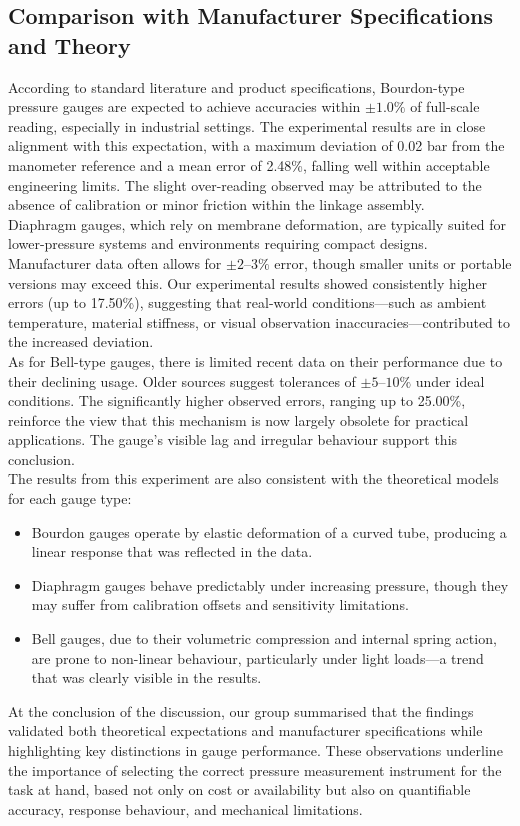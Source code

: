 \documentclass{article}
\begin{document}
\subsection{Comparison with Manufacturer Specifications and Theory}
According to standard literature and product specifications, Bourdon-type pressure gauges are expected to achieve accuracies within $\pm1.0\%$ of full-scale reading, especially in industrial settings. The experimental results are in close alignment with this expectation, with a maximum deviation of 0.02 bar from the manometer reference and a mean error of 2.48\%, falling well within acceptable engineering limits. The slight over-reading observed may be attributed to the absence of calibration or minor friction within the linkage assembly.\\[8pt]
Diaphragm gauges, which rely on membrane deformation, are typically suited for lower-pressure systems and environments requiring compact designs. Manufacturer data often allows for $\pm2$--$3\%$ error, though smaller units or portable versions may exceed this. Our experimental results showed consistently higher errors (up to 17.50\%), suggesting that real-world conditions—such as ambient temperature, material stiffness, or visual observation inaccuracies—contributed to the increased deviation.\\[8pt]
As for Bell-type gauges, there is limited recent data on their performance due to their declining usage. Older sources suggest tolerances of $\pm5$--$10\%$ under ideal conditions. The significantly higher observed errors, ranging up to 25.00\%, reinforce the view that this mechanism is now largely obsolete for practical applications. The gauge's visible lag and irregular behaviour support this conclusion.\\[8pt]
The results from this experiment are also consistent with the theoretical models for each gauge type:
\begin{itemize}
	\item Bourdon gauges operate by elastic deformation of a curved tube, producing a linear response that was reflected in the data.
	\item Diaphragm gauges behave predictably under increasing pressure, though they may suffer from calibration offsets and sensitivity limitations.
	\item Bell gauges, due to their volumetric compression and internal spring action, are prone to non-linear behaviour, particularly under light loads—a trend that was clearly visible in the results.
\end{itemize}
At the conclusion of the discussion, our group summarised that the findings validated both theoretical expectations and manufacturer specifications while highlighting key distinctions in gauge performance. These observations underline the importance of selecting the correct pressure measurement instrument for the task at hand, based not only on cost or availability but also on quantifiable accuracy, response behaviour, and mechanical limitations.	\newpage
\end{document}
